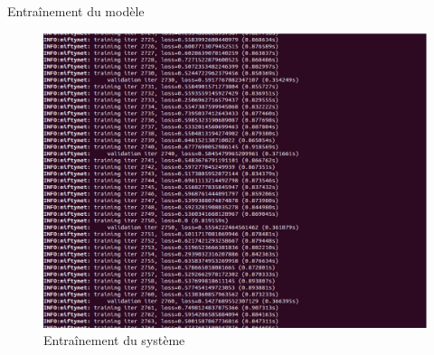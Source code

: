 \documentclass{beamer}
\begin{document}
\begin{frame}[t]{Entraînement du modèle}
  \begin{figure}
    \begin{center}
      \includegraphics[scale=0.2]{annex/entrainement}
      \caption{Entraînement du système}
      \label{entrainement}
    \end{center}
  \end{figure}
\end{frame}
\end{document}
